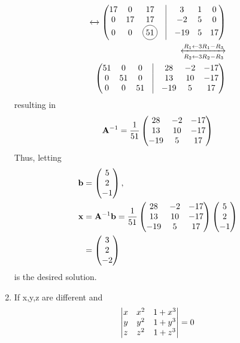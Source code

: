 \documentclass[journal,12pt,twocolumn]{IEEEtran}
\renewcommand\thesection{\arabic{section}}
\begin{document}
\begin{enumerate}[label=\thesection.\arabic*.,ref=\thesection.\theenumi]
\begin{align}
	\\
	\xleftrightarrow []{}
	\myvec{17 & 0 & 17 & \vrule & 3 & 1 & 0\\ 0 & 17 & 17 & \vrule & -2 & 5 & 0\\ 0 & 0 & \circled{51} & \vrule & -19 & 5 & 17}
	\\
	\xleftrightarrow [R_2\leftarrow 3R_2 - R_3]{R_1\leftarrow 3R_1 - R_3}
	\\
	\myvec{51 & 0 & 0 & \vrule & 28 & -2& -17\\ 0 & 51 & 0 & \vrule & 13 & 10 & -17\\ 0 & 0 & 51 & \vrule & -19 & 5 & 17}
    \end{align}
    resulting in 
\begin{align}
	\mathbf{A}^{-1} = \frac{1}{51}\begin{pmatrix} 28 & -2 & -17\\  13 & 10 & -17\\  -19 & 5 & 17\end{pmatrix}
    \end{align}
    Thus, letting 
\begin{align}
	\mathbf{b} &= \begin{pmatrix} 5 \\ 2 \\ -1\end{pmatrix},
	\\
	\mathbf{x} &= \mathbf{A}^{-1}\mathbf{b} = \frac{1}{51}\begin{pmatrix} 28 & -2 & -17\\  13 & 10 & -17\\  -19 & 5 & 17\end{pmatrix}\begin{pmatrix} 5 \\ 2 \\ -1\end{pmatrix}
	\\
	&= \begin{pmatrix} 3 \\ 2 \\ -2\end{pmatrix}
    \end{align}
    is the desired solution.
    
\item If x,y,z are different and 
\begin{align}
	\begin{vmatrix}x & x^2 & 1+x^3 \\ y & y^2 & 1+y^3 \\ z & z^2 & 1+z^3 \end{vmatrix} =0 
	\label{eq:det_xyz_given}
    \end{align}


\end{enumerate}
\end{document}
